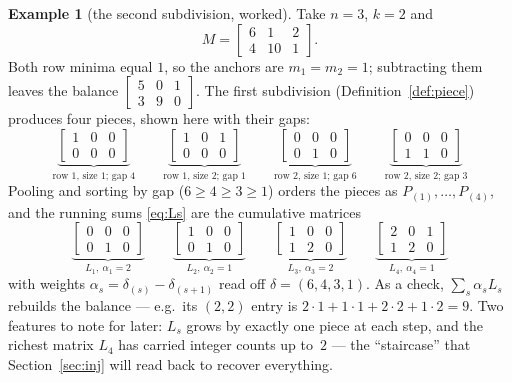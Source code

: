 \documentclass[11pt,a4paper]{article}
\theoremstyle{definition}
\newtheorem{example}[definition]{Example}
\theoremstyle{plain}
\begin{document}
\begin{example}[the second subdivision, worked]\label{ex:secondsd}
Take $n=3$, $k=2$ and
\[
   M=\begin{bmatrix}6&1&2\\4&10&1\end{bmatrix}.
\]
Both row minima equal $1$, so the anchors are $m_1=m_2=1$; subtracting them
leaves the balance $\left[\begin{smallmatrix}5&0&1\\3&9&0\end{smallmatrix}\right]$.
The first subdivision (Definition~\ref{def:piece}) produces four pieces, shown
here with their gaps:
\[
 \underbrace{\left[\begin{smallmatrix}1&0&0\\0&0&0\end{smallmatrix}\right]}
   _{\text{row 1, size 1; gap }4}\qquad
 \underbrace{\left[\begin{smallmatrix}1&0&1\\0&0&0\end{smallmatrix}\right]}
   _{\text{row 1, size 2; gap }1}\qquad
 \underbrace{\left[\begin{smallmatrix}0&0&0\\0&1&0\end{smallmatrix}\right]}
   _{\text{row 2, size 1; gap }6}\qquad
 \underbrace{\left[\begin{smallmatrix}0&0&0\\1&1&0\end{smallmatrix}\right]}
   _{\text{row 2, size 2; gap }3}
\]
Pooling and sorting by gap ($6\ge4\ge3\ge1$) orders the pieces as
$P_{(1)},\dots,P_{(4)}$, and the running sums \eqref{eq:Ls} are the cumulative
matrices
\[
 \underbrace{\left[\begin{smallmatrix}0&0&0\\0&1&0\end{smallmatrix}\right]}
   _{L_1,\ \alpha_1=2}\qquad
 \underbrace{\left[\begin{smallmatrix}1&0&0\\0&1&0\end{smallmatrix}\right]}
   _{L_2,\ \alpha_2=1}\qquad
 \underbrace{\left[\begin{smallmatrix}1&0&0\\1&2&0\end{smallmatrix}\right]}
   _{L_3,\ \alpha_3=2}\qquad
 \underbrace{\left[\begin{smallmatrix}2&0&1\\1&2&0\end{smallmatrix}\right]}
   _{L_4,\ \alpha_4=1}
\]
with weights $\alpha_s=\delta_{(s)}-\delta_{(s+1)}$ read off
$\delta=(6,4,3,1)$. As a check, $\sum_s\alpha_s L_s$ rebuilds the balance ---
e.g.\ its $(2,2)$ entry is $2{\cdot}1+1{\cdot}1+2{\cdot}2+1{\cdot}2=9$. Two
features to note for later: $L_s$ grows by exactly one piece at each step, and
the richest matrix $L_4$ has carried integer counts up to~$2$ --- the
``staircase'' that Section~\ref{sec:inj} will read back to recover everything.
\end{example}
\end{document}
